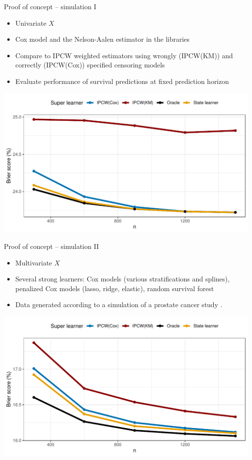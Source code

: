 \documentclass[smaller]{beamer}\usepackage{listings}
\begin{document}
\begin{frame}[label={sec:org1447ea9}]{Proof of concept -- simulation I}
\small

\begin{itemize}
\item Univariate \(X\)
\item Cox model and the Nelson-Aalen estimator in the libraries
\item Compare to IPCW weighted estimators using wrongly (IPCW(KM)) and correctly
(IPCW(Cox)) specified censoring models
\item Evaluate performance of survival predictions at fixed prediction horizon
\end{itemize}

\begin{center}
\includegraphics[width=.9\textwidth]{./ipcw-fail.pdf}
\end{center}
\end{frame}

\begin{frame}[label={sec:org531a91d}]{Proof of concept -- simulation II}
\small

\begin{itemize}
\item Multivariate \(X\)
\item Several strong learners: Cox models (various stratifications and splines),
penalized Cox models (lasso, ridge, elastic), random survival forest
\item Data generated according to a simulation of a prostate cancer study
\citep{kattan2000pretreatment,gerds2013estimating}.
\end{itemize}

\begin{center}
\includegraphics[width=.9\textwidth]{./zelefski-sim.pdf}
\end{center}
\end{frame}
\end{document}
